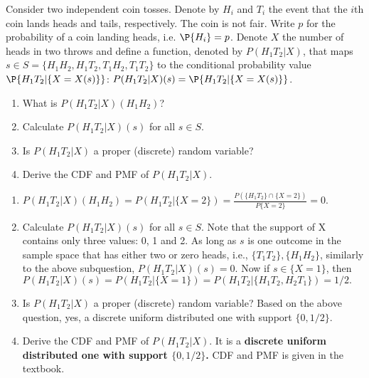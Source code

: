 \begin{exercise}\label{ex:chap03:02} 
	Consider two independent coin tosses. Denote by $H_i$ and $T_i$ the event that the $i$th coin lands heads and tails, respectively. The coin is not fair. Write $p$ for the probability of a coin landing heads, i.e. $\P{H_i} = p$. Denote $X$ the number of heads in two throws and define a function, denoted by $P(H_1T_2|X)$, that maps $s \in S = \{H_1H_2, H_1T_2, T_1H_2, T_1T_2\}$ to the conditional probability value $\P{H_1T_2|\{X = X(s)\}}$: $P(H_1T_2|X)(s)=\P{H_1T_2|\{X = X(s)\}}$.
	\begin{enumerate}
		\item What is $P\left(H_1T_2|X\right)(H_1H_2)$?
		\item Calculate $P(H_1T_2|X)(s)$ for all $s\in S$.
		\item Is $P(H_1T_2|X)$ a proper (discrete) random variable?
		\item Derive the CDF and PMF of $P(H_1T_2|X)$.
	\end{enumerate} 
	\begin{solution}
			\begin{enumerate}
			\item   $P(H_1T_2|X)(H_1H_2)=P(H_1T_2|\{X=2\})= \frac{P(\{H_1T_2\}\cap \{X=2\})}{P\{X=2\}}=0$.
			\item Calculate $P(H_1T_2|X)(s)$ for all $s\in S$. Note that the support of X contains only three values: 0, 1 and 2. As long as $s$ is one outcome in the sample space that has either two or zero heads, i.e., $\{T_1T_2\},\{H_1H_2\}$, similarly to the above subquestion, $P(H_1T_2|X)(s)=0$. Now if $s\in \{X=1\}$, then $P(H_1T_2|X)(s)= P(H_1T_2|\{X=1\})= P(H_1T_2|\{H_1T_2, H_2T_1\})=1/2.$
			\item Is $P(H_1T_2|X)$ a proper (discrete) random variable? Based on the above question, yes, a discrete uniform distributed one with support $\{0,1/2\}$.
			\item Derive the CDF and PMF of $P(H_1T_2|X)$. It is a \textbf{discrete uniform distributed one with support $\{0,1/2\}$.} CDF and PMF is given in the textbook.
		\end{enumerate} 
	\end{solution}
\end{exercise}
 
